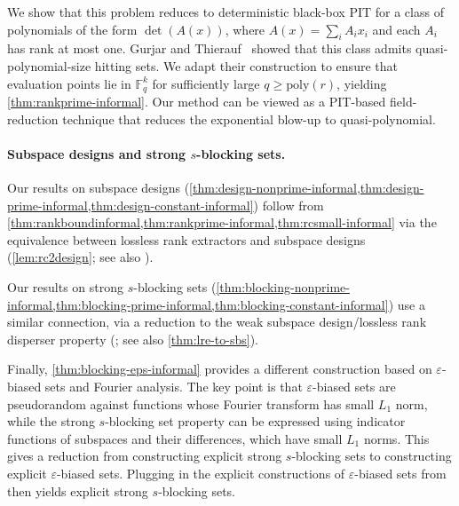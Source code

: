\documentclass[11pt]{article}
\newcommand{\eps}{\varepsilon}
\newcommand{\F}{\mathbb{F}}
\newcommand{\poly}{\mathrm{poly}}
\begin{document}
We show that this problem reduces to deterministic black-box PIT for a class of polynomials of the form $\det(A(x))$, where $A(x)=\sum_i A_i x_i$ and each $A_i$ has rank at most one. Gurjar and Thierauf~\cite{DBLP:journals/cc/GurjarT20} showed that this class admits quasi-polynomial-size hitting sets. We adapt their construction to ensure that evaluation points lie in $\F_q^k$ for sufficiently large $q\geq \poly(r)$, yielding \cref{thm:rankprime-informal}. Our method can be viewed as a PIT-based field-reduction technique that reduces the exponential blow-up to quasi-polynomial.

\paragraph{Subspace designs and strong $s$-blocking sets.}

Our results on subspace designs (\cref{thm:design-nonprime-informal,thm:design-prime-informal,thm:design-constant-informal}) follow from \cref{thm:rankboundinformal,thm:rankprime-informal,thm:rcsmall-informal} via the equivalence between lossless rank extractors and subspace designs (\cref{lem:rc2design}; see also \cite[Proposition~6.1]{FG15}).


Our results on strong $s$-blocking sets (\cref{thm:blocking-nonprime-informal,thm:blocking-prime-informal,thm:blocking-constant-informal}) use a similar connection, via a reduction to the weak subspace design/lossless rank disperser property (\cite[Proposition~10]{FZ16}; see also \cref{thm:lre-to-sbs}).

Finally, \cref{thm:blocking-eps-informal} provides a different construction based on $\eps$-biased sets and Fourier analysis. The key point is that $\eps$-biased sets are pseudorandom against functions whose Fourier transform has small $L_1$ norm, while the strong $s$-blocking set property can be expressed using indicator functions of subspaces and their differences, which have small $L_1$ norms. This gives a reduction from constructing explicit strong $s$-blocking sets to constructing explicit $\eps$-biased sets. Plugging in the explicit constructions of $\eps$-biased sets from \cite{Ta17,JM21} then yields explicit strong $s$-blocking sets.
\end{document}
